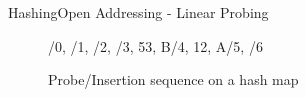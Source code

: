 \begin{frame}{Hashing}{Open Addressing - Linear Probing}
\begin{itemize}
\begin{figure}[!h]
{          \relax/0,
          \relax/1,
          \relax/2,
          \relax/3,
          {53, {\color{green2}B}}/4,
          {12, {\color{green2}A}}/5,
          \relax/6
        }%
        \def\LPEShowIndex{0}%
        \begin{adjustbox}{width=0.75\linewidth}%
        \end{adjustbox}
        \vspace{-0.5em}%
        \caption{Probe/Insertion sequence on a hash map}%
        \label{fig:hashing:open_addressing:linear_probing_example2}%
      \end{figure}
  \end{itemize}
\end{frame}


